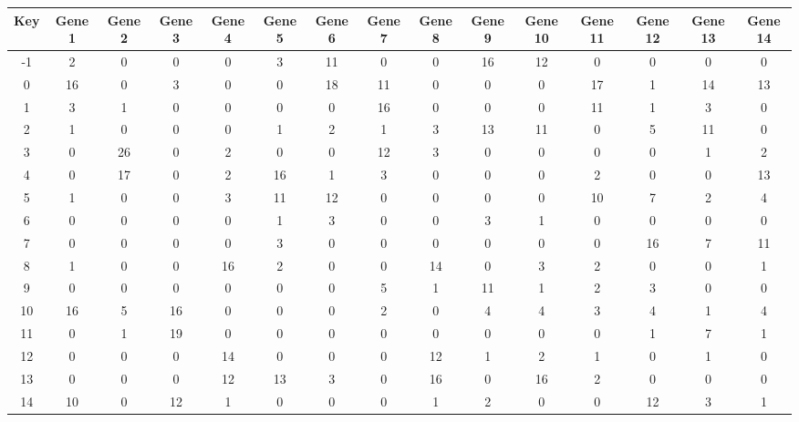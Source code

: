 \begin{tabular}{|c|c|c|c|c|c|c|c|c|c|c|c|c|c|c|}
\hline
Key & Gene 1 & Gene 2 & Gene 3 & Gene 4 & Gene 5 & Gene 6 & Gene 7 & Gene 8 & Gene 9 & Gene 10 & Gene 11 & Gene 12 & Gene 13 & Gene 14 \\
\hline
-1 & 2 & 0 & 0 & 0 & 3 & 11 & 0 & 0 & 16 & 12 & 0 & 0 & 0 & 0 \\
0 & 16 & 0 & 3 & 0 & 0 & 18 & 11 & 0 & 0 & 0 & 17 & 1 & 14 & 13 \\
1 & 3 & 1 & 0 & 0 & 0 & 0 & 16 & 0 & 0 & 0 & 11 & 1 & 3 & 0 \\
2 & 1 & 0 & 0 & 0 & 1 & 2 & 1 & 3 & 13 & 11 & 0 & 5 & 11 & 0 \\
3 & 0 & 26 & 0 & 2 & 0 & 0 & 12 & 3 & 0 & 0 & 0 & 0 & 1 & 2 \\
4 & 0 & 17 & 0 & 2 & 16 & 1 & 3 & 0 & 0 & 0 & 2 & 0 & 0 & 13 \\
5 & 1 & 0 & 0 & 3 & 11 & 12 & 0 & 0 & 0 & 0 & 10 & 7 & 2 & 4 \\
6 & 0 & 0 & 0 & 0 & 1 & 3 & 0 & 0 & 3 & 1 & 0 & 0 & 0 & 0 \\
7 & 0 & 0 & 0 & 0 & 3 & 0 & 0 & 0 & 0 & 0 & 0 & 16 & 7 & 11 \\
8 & 1 & 0 & 0 & 16 & 2 & 0 & 0 & 14 & 0 & 3 & 2 & 0 & 0 & 1 \\
9 & 0 & 0 & 0 & 0 & 0 & 0 & 5 & 1 & 11 & 1 & 2 & 3 & 0 & 0 \\
10 & 16 & 5 & 16 & 0 & 0 & 0 & 2 & 0 & 4 & 4 & 3 & 4 & 1 & 4 \\
11 & 0 & 1 & 19 & 0 & 0 & 0 & 0 & 0 & 0 & 0 & 0 & 1 & 7 & 1 \\
12 & 0 & 0 & 0 & 14 & 0 & 0 & 0 & 12 & 1 & 2 & 1 & 0 & 1 & 0 \\
13 & 0 & 0 & 0 & 12 & 13 & 3 & 0 & 16 & 0 & 16 & 2 & 0 & 0 & 0 \\
14 & 10 & 0 & 12 & 1 & 0 & 0 & 0 & 1 & 2 & 0 & 0 & 12 & 3 & 1 \\
\hline
\end{tabular}